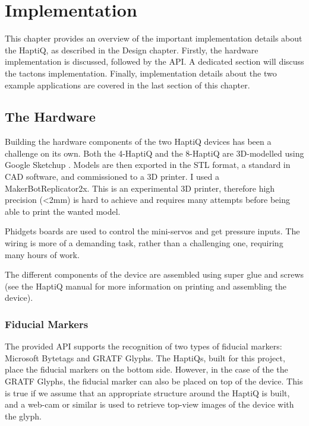 \chapter{Implementation}

This chapter provides an overview of the important implementation details about the HaptiQ, as described in the Design chapter. 
Firstly, the hardware implementation is discussed, followed by the API. A dedicated section will discuss the tactons implementation. Finally, implementation details about the two example applications are covered in the last section of this chapter.

\section{The Hardware}

Building the hardware components of the two HaptiQ devices has been a challenge on its own. Both the 4-HaptiQ and the 8-HaptiQ are 3D-modelled using Google Sketchup . Models are then exported in the STL format, a standard in CAD software, and commissioned to a 3D printer. I used a MakerBot\textregistered   Replicator\texttrademark 2x. This is an experimental 3D printer, therefore high precision (\textless 2mm) is hard to achieve and requires many attempts before being able to print the wanted model. 

Phidgets boards are used to control the mini-servos and get pressure inputs. The wiring is more of a demanding task, rather than a challenging one, requiring many hours of work.

The different components of the device are assembled using super glue and screws (see the HaptiQ manual for more information on printing and assembling the device). 

\subsection{Fiducial Markers}

The provided API supports the recognition of two types of fiducial markers: Microsoft Bytetags and GRATF Glyphs. The HaptiQs, built for this project, place the fiducial markers on the bottom side. However, in the case of the the GRATF Glyphs, the fiducial marker can also be placed on top of the device. This is true if we assume that an appropriate structure around the HaptiQ is built, and a web-cam or similar is used to retrieve top-view images of the device with the glyph.

